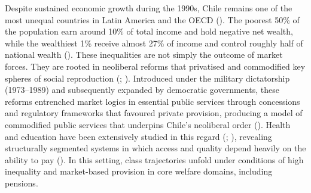 \documentclass[
  12pt,
]{article}
\begin{document}
Despite sustained economic growth during the 1990s, Chile remains one of
the most unequal countries in Latin America and the OECD
(). The poorest 50\%
of the population earn around 10\% of total income and hold negative net
wealth, while the wealthiest 1\% receive almost 27\% of income and
control roughly half of national wealth
(). These
inequalities are not simply the outcome of market forces. They are
rooted in neoliberal reforms that privatised and commodified key spheres
of social reproduction (;
). Introduced under the
military dictatorship (1973--1989) and subsequently expanded by
democratic governments, these reforms entrenched market logics in
essential public services through concessions and regulatory frameworks
that favoured private provision, producing a model of commodified public
services that underpins Chile's neoliberal order
(). Health and
education have been extensively studied in this regard
(;
), revealing structurally segmented systems in which access and
quality depend heavily on the ability to pay
(). In this setting, class trajectories unfold under conditions of
high inequality and market-based provision in core welfare domains,
including pensions.
\end{document}
